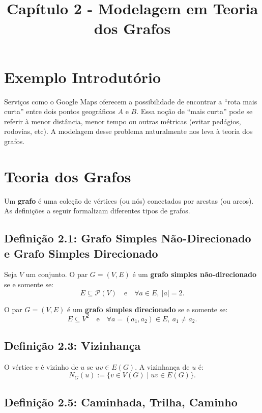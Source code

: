 \documentclass[a4paper,12pt]{article}
\title{Capítulo 2 - Modelagem em Teoria dos Grafos}
\author{}
\date{}
\begin{document}
\maketitle

\section{Exemplo Introdutório}

Serviços como o Google Maps oferecem a possibilidade de encontrar a ``rota mais curta'' entre dois pontos geográficos \( A \) e \( B \). Essa noção de ``mais curta'' pode se referir à menor distância, menor tempo ou outras métricas (evitar pedágios, rodovias, etc). A modelagem desse problema naturalmente nos leva à teoria dos grafos.

\section{Teoria dos Grafos}

Um \textbf{grafo} é uma coleção de vértices (ou nós) conectados por arestas (ou arcos). As definições a seguir formalizam diferentes tipos de grafos.

\subsection*{Definição 2.1: Grafo Simples Não-Direcionado e Grafo Simples Direcionado}

Seja \( V \) um conjunto. O par \( G = (V, E) \) é um \textbf{grafo simples não-direcionado} se e somente se:
\[
E \subseteq \mathcal{P}(V) \quad \text{e} \quad \forall a \in E, \ |a| = 2.
\]

O par \( G = (V, E) \) é um \textbf{grafo simples direcionado} se e somente se:
\[
E \subseteq V^2 \quad \text{e} \quad \forall a = (a_1, a_2) \in E, \ a_1 \neq a_2.
\]

\subsection*{Definição 2.3: Vizinhança}

O vértice \( v \) é vizinho de \( u \) se \( uv \in E(G) \). A vizinhança de \( u \) é:
\[
N_G(u) := \{ v \in V(G) \mid uv \in E(G) \}.
\]

\subsection*{Definição 2.5: Caminhada, Trilha, Caminho}
\end{document}
